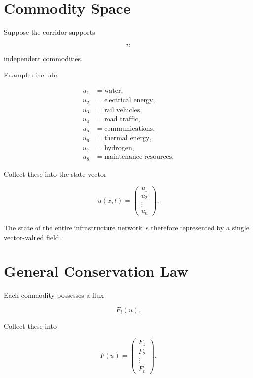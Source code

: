 \documentclass[11pt,fleqn]{book}
\numberwithin{equation}{chapter}
\theoremstyle{plain}
\theoremstyle{definition}
\theoremstyle{remark}
\begin{document}

\section{Commodity Space}

Suppose the corridor supports

\[
n
\]

independent commodities.

Examples include

\[
\begin{aligned}
u_1 &= \text{water},\\
u_2 &= \text{electrical energy},\\
u_3 &= \text{rail vehicles},\\
u_4 &= \text{road traffic},\\
u_5 &= \text{communications},\\
u_6 &= \text{thermal energy},\\
u_7 &= \text{hydrogen},\\
u_8 &= \text{maintenance resources}.
\end{aligned}
\]

Collect these into the state vector

\[
u(x,t)
=
\begin{pmatrix}
u_1\\
u_2\\
\vdots\\
u_n
\end{pmatrix}.
\]

The state of the entire infrastructure network is therefore represented
by a single vector-valued field.


\section{General Conservation Law}

Each commodity possesses a flux

\[
F_i(u).
\]

Collect these into

\[
F(u)
=
\begin{pmatrix}
F_1\\
F_2\\
\vdots\\
F_n
\end{pmatrix}.
\]
\end{document}
